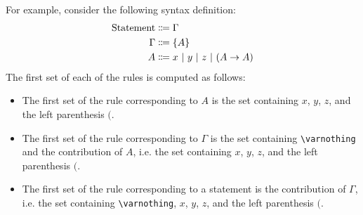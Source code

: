 For example, consider the following syntax definition:
\begin{align*}
    \text{Statement} &\Coloneqq \Gamma \\
    \Gamma &\Coloneqq \{ A \} \\
    A &\Coloneqq x \ |\  y \ |\  z \ |\  (A \to A)
\end{align*}
The first set of each of the rules is computed as follows:
\begin{itemize}
    \item The first set of the rule corresponding to $A$ is the set containing $x$, $y$, $z$, and the left parenthesis $($.
    \item The first set of the rule corresponding to $\Gamma$ is the set containing \lstinline{\varnothing} and the contribution of $A$, i.e. the set containing $x$, $y$, $z$, and the left parenthesis $($.
    \item The first set of the rule corresponding to a statement is the contribution of $\Gamma$, i.e. the set containing \lstinline{\varnothing}, $x$, $y$, $z$, and the left parenthesis $($.
\end{itemize}


